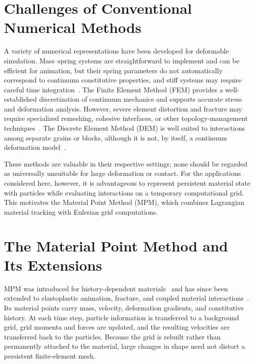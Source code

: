 \section{Challenges of Conventional Numerical Methods}
    A variety of numerical representations have been developed for deformable simulation. Mass--spring systems are straightforward to implement and can be efficient for animation, but their spring parameters do not automatically correspond to continuum constitutive properties, and stiff systems may require careful time integration~\citep{10.1145/37402.37427,10.1145/280814.280821}. The Finite Element Method (FEM) provides a well-established discretization of continuum mechanics and supports accurate stress and deformation analysis. However, severe element distortion and fracture may require specialized remeshing, cohesive interfaces, or other topology-management techniques~\citep{10.1145/1198555.1198573,10.1145/566570.566579}. The Discrete Element Method (DEM) is well suited to interactions among separate grains or blocks, although it is not, by itself, a continuum deformation model~\citep{cundall1979discrete}.
    
    These methods are valuable in their respective settings; none should be regarded as universally unsuitable for large deformation or contact. For the applications considered here, however, it is advantageous to represent persistent material state with particles while evaluating interactions on a temporary computational grid. This motivates the Material Point Method (MPM), which combines Lagrangian material tracking with Eulerian grid computations.
    
\section{The Material Point Method and Its Extensions}
    MPM was introduced for history-dependent materials~\citep{sulsky1994particle} and has since been extended to elastoplastic animation, fracture, and coupled material interactions~\citep{2013-mpm,2019-cdmpm,de2020material}. Its material points carry mass, velocity, deformation gradients, and constitutive history. At each time step, particle information is transferred to a background grid, grid momenta and forces are updated, and the resulting velocities are transferred back to the particles. Because the grid is rebuilt rather than permanently attached to the material, large changes in shape need not distort a persistent finite-element mesh.
    
